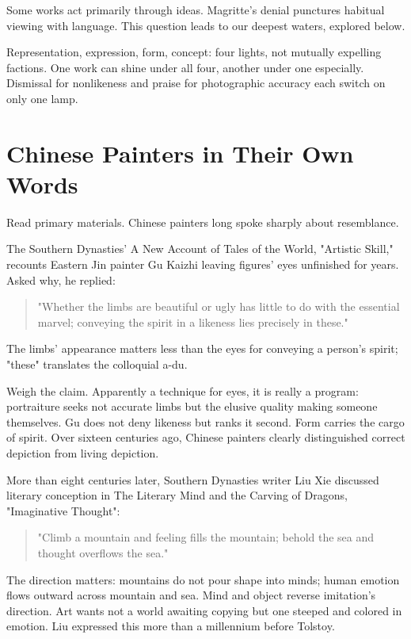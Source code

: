 Some works act primarily through ideas. Magritte's denial punctures habitual viewing with language. This question leads to our deepest waters, explored below.

Representation, expression, form, concept: four lights, not mutually expelling factions. One work can shine under all four, another under one especially. Dismissal for nonlikeness and praise for photographic accuracy each switch on only one lamp.

\section{Chinese Painters in Their Own Words}
Read primary materials. Chinese painters long spoke sharply about resemblance.

The Southern Dynasties' A New Account of Tales of the World, "Artistic Skill," recounts Eastern Jin painter Gu Kaizhi leaving figures' eyes unfinished for years. Asked why, he replied:

\begin{quote}
"Whether the limbs are beautiful or ugly has little to do with the essential marvel; conveying the spirit in a likeness lies precisely in these."
\end{quote}
The limbs' appearance matters less than the eyes for conveying a person's spirit; "these" translates the colloquial a-du.

Weigh the claim. Apparently a technique for eyes, it is really a program: portraiture seeks not accurate limbs but the elusive quality making someone themselves. Gu does not deny likeness but ranks it second. Form carries the cargo of spirit. Over sixteen centuries ago, Chinese painters clearly distinguished correct depiction from living depiction.

More than eight centuries later, Southern Dynasties writer Liu Xie discussed literary conception in The Literary Mind and the Carving of Dragons, "Imaginative Thought":

\begin{quote}
"Climb a mountain and feeling fills the mountain; behold the sea and thought overflows the sea."
\end{quote}
The direction matters: mountains do not pour shape into minds; human emotion flows outward across mountain and sea. Mind and object reverse imitation's direction. Art wants not a world awaiting copying but one steeped and colored in emotion. Liu expressed this more than a millennium before Tolstoy.

